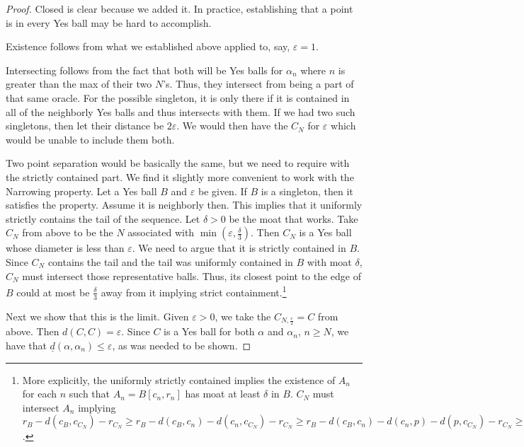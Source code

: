 \documentclass[12pt]{article}
\begin{document}
\begin{proof}
    Closed is clear because we added it. In practice, establishing that a point is in every Yes ball may be hard to accomplish. 
    
    Existence follows from what we established above applied to, say, $\varepsilon = 1$.    

    Intersecting follows from the fact that both will be Yes balls for $\alpha_n$ where $n$ is greater than the max of their two $N$'s. Thus, they intersect from being a part of that same oracle. For the possible singleton, it is only there if it is contained in all of the neighborly Yes balls and thus intersects with them. If we had two such singletons, then let their distance be $2\varepsilon$. We would then have the $C_N$ for $\varepsilon$ which would be unable to include them both. 

    Two point separation would be basically the same, but we need to require with the strictly contained part. We find it slightly more convenient to work with the Narrowing property. Let a Yes ball $B$ and $\varepsilon$ be given. If $B$ is a singleton, then it satisfies the property. Assume it is neighborly then. This implies that it uniformly strictly contains the tail of the sequence. Let $\delta > 0$ be the moat that works. Take $C_N$ from above to be the $N$ associated with $\min(\varepsilon, \frac{\delta}{3})$. Then $C_N$ is a Yes ball whose diameter is less than $\varepsilon$. We need to argue that it is strictly contained in $B$. Since $C_N$ contains the tail and the tail was uniformly contained in $B$ with moat $\delta$, $C_N$ must intersect those representative balls. Thus, its closest point to the edge of $B$ could at most be $\frac{\delta}{3}$ away from it implying strict containment.\footnote{More explicitly, the uniformly strictly contained implies the existence of $A_n$ for each $n$ such that $A_n= B[c_n, r_n]$ has moat at least $\delta$ in $B$. $C_N$ must intersect $A_n$ implying $r_B - d(c_B, c_{C_N}) - r_{C_N} \geq r_B - d(c_B, c_n) - d(c_n, c_{C_N}) - r_{C_N} \geq r_B - d(c_B, c_n) -  d(c_n, p) -  d(p, c_{C_N})  - r_{C_N}  \geq  r_B - d(c_B, c_n) - r_n -  - 2r_{C_N} > \delta - \frac{2 \delta}{3} = \frac{\delta}{3}$.  }

    Next we show that this is the limit. Given $\varepsilon >0$, we take the $C_{N, \frac{\varepsilon}{2}} = C$ from above. Then $d(C, C) = \varepsilon$. Since $C$ is a Yes ball for both $\alpha$ and $\alpha_n$, $n \geq N$, we have that  $\underline{d}(\alpha, \alpha_n) \leq \varepsilon$, as was needed to be shown. 
\end{proof}
\end{document}
